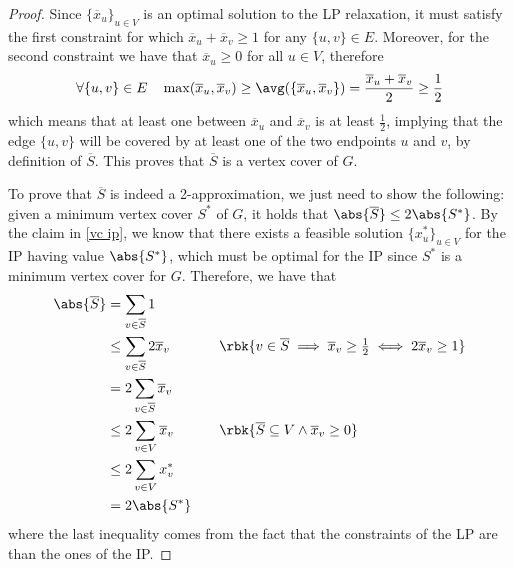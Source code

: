 \documentclass[a4paper, 12pt]{report}
\begin{document}
    \begin{proof}
        Since $\{\overline x_u\}_{u \in V}$ is an optimal solution to the LP relaxation, it must satisfy the first constraint for which $\overline x_u + \overline x_v \ge 1$ for any $\{u, v\} \in E$. Moreover, for the second constraint we have that $\overline x_u \ge 0$ for all $u \in V$, therefore $$\forall \{u, v\} \in E \quad \max(\overline x_u, \overline x_v) \ge \avg(\{\overline x_u, \overline x_v\}) = \dfrac{\overline x_u + \overline x_v}{2} \ge \dfrac{1}{2}$$ which means that at least one between $\overline x_u$ and $\overline x_v$ is at least $\frac{1}{2}$, implying that the edge $\{u, v\}$ will be covered by at least one of the two endpoints $u$ and $v$, by definition of $\overline S$. This proves that $\overline S$ is a vertex cover of $G$.

        To prove that $\overline S$ is indeed a 2-approximation, we just need to show the following: given a minimum vertex cover $S^*$ of $G$, it holds that $\abs{\overline S} \le 2 \abs{S^*}$. By the claim in \cref{vc ip}, we know that there exists a feasible solution $\{x^*_u\}_{u \in V}$ for the IP having value $\abs{S^*}$, which must be optimal for the IP since $S^*$ is a minimum vertex cover for $G$. Therefore, we have that
            \begin{equation*}
                \begin{alignedat}{2}
                    \abs{\overline S} &= \sum_{v \in \overline S}{1} && \\
                                      &\le \sum_{v \in \overline S}{2 \overline x_v} && \quad \quad \rbk{v \in \overline S \implies \overline x_v \ge \tfrac{1}{2} \iff 2 \overline x_v \ge 1}\\
                                      &= 2 \sum_{v \in \overline S}{\overline x_v} && \\
                                      &\le 2 \sum_{v \in V}{\overline x_v} && \quad \quad \rbk{\overline S \subseteq V \land \overline x_v \ge 0} \\
                                      &\le 2 \sum_{v \in V}{x^*_v} && \\
                                      &= 2 \abs{S^*} &&\\
                \end{alignedat}
            \end{equation*}
            where the last inequality comes from the fact that the constraints of the LP are  than the ones of the IP.
    \end{proof}
\end{document}
